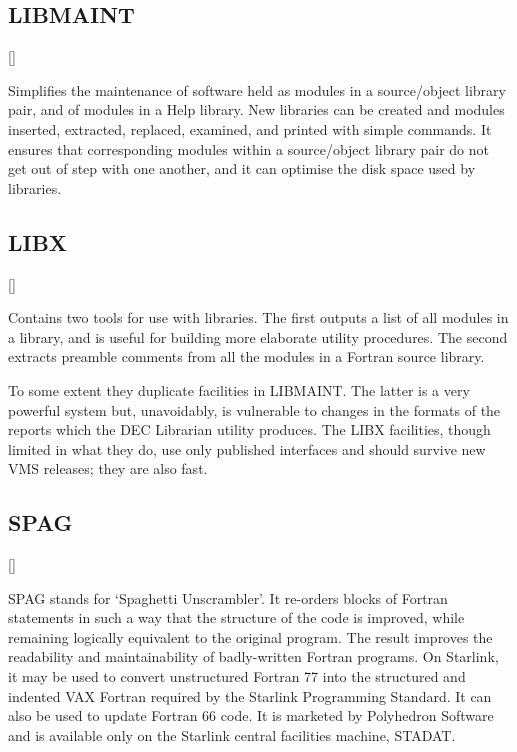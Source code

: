 \subsection{LIBMAINT}

\vspace{-10mm}

\hfill []

\vspace{2mm}

Simplifies the maintenance of software held as modules in a source/object
library pair, and of modules in a Help library.
New libraries can be created and modules inserted, extracted, replaced,
examined, and printed with simple commands.
It ensures that corresponding modules within a source/object library pair do not
get out of step with one another, and it can optimise the disk space used by
libraries.

\subsection{LIBX}

\vspace{-10mm}

\hfill []

\vspace{2mm}

Contains two tools for use with libraries.
The first outputs a list of all modules in a library, and is useful for building
more elaborate utility procedures.
The second extracts preamble comments from all the modules in a Fortran
source library.

To some extent they duplicate facilities in LIBMAINT.
The latter is a very powerful system but, unavoidably, is vulnerable to
changes in the formats of the reports which the DEC Librarian utility produces.
The LIBX facilities, though limited in what they do, use only published
interfaces and should survive new VMS releases; they are also fast.

\subsection{SPAG}

\vspace{-10mm}

\hfill []

\vspace{2mm}

SPAG stands for `Spaghetti Unscrambler'.
It re-orders blocks of Fortran statements in such a way that the structure of
the code is improved, while remaining logically equivalent to the original
program. 
The result improves the readability and maintainability of badly-written
Fortran programs.
On Starlink, it may be used to convert unstructured Fortran 77 into the
structured and indented VAX Fortran required by the Starlink Programming
Standard.
It can also be used to update Fortran 66 code.
It is marketed by Polyhedron Software and is available only on the Starlink
central facilities machine, STADAT.


